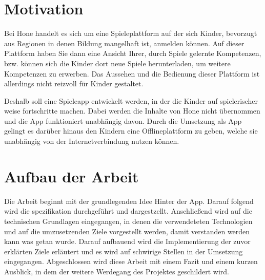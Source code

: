 


\section{Motivation}
Bei Hone handelt es sich um eine Spieleplattform auf der sich Kinder, bevorzugt aus Regionen in denen Bildung mangelhaft ist, anmelden können. Auf dieser Plattform haben Sie dann eine Ansicht Ihrer, durch Spiele gelernte Kompetenzen, bzw. können sich die Kinder dort neue Spiele herunterladen, um weitere Kompetenzen zu erwerben. Das Aussehen und die Bedienung dieser Plattform ist allerdings nicht reizvoll für Kinder gestaltet. 

Deshalb soll eine Spieleapp entwickelt werden, in der die Kinder auf spielerischer weise fortschritte machen. Dabei werden die Inhalte von Hone nicht übernommen und die App funktioniert unabhängig davon. Durch die Umsetzung als App gelingt es darüber hinaus den Kindern eine Offlineplattform zu geben, welche sie unabhängig von der Internetverbindung nutzen können. 

\section{Aufbau der Arbeit}

Die Arbeit beginnt mit der grundlegenden Idee Hinter der App. Darauf folgend wird die spezifikation durchgeführt und dargestzellt. Anschließend wird auf die technischen Grundlagen eingegangen, in denen die verwendeteten Technologien und auf die umzusetzenden Ziele vorgestellt werden, damit verstanden werden kann was getan wurde. Darauf aufbauend wird die Implementierung der zuvor erklärten Ziele erläutert und es wird auf schwirige Stellen in der Umsetzung eingegangen. Abgeschlossen wird diese Arbeit mit einem Fazit und einem kurzen Ausblick, in dem der weitere Werdegang des Projektes geschildert wird.

